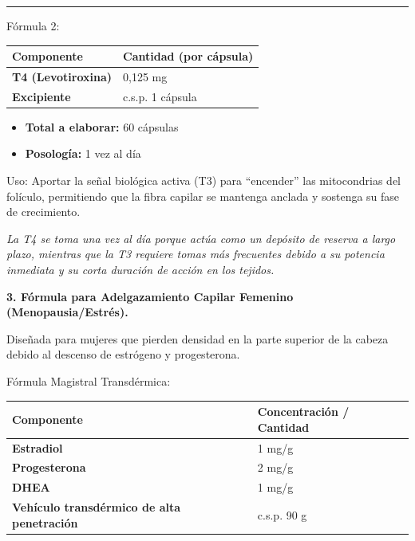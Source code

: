 \documentclass[
  spanish,
]{article}
\newcounter{none} %
\providecommand{\tightlist}{%
  \setlength{\itemsep}{0pt}\setlength{\parskip}{0pt}}
\begin{document}
\begin{center}\rule{0.5\linewidth}{0.5pt}\end{center}

Fórmula 2:

{\def\LTcaptype{none} %
\begin{longtable}[]{@{}ll@{}}
\toprule\noalign{}
Componente & Cantidad (por cápsula) \\
\midrule\noalign{}
\endhead
\bottomrule\noalign{}
\endlastfoot
\textbf{T4 (Levotiroxina)} & 0,125 mg \\
\textbf{Excipiente} & c.s.p. 1 cápsula \\
\end{longtable}
}

\begin{itemize}
\tightlist
\item
  \textbf{Total a elaborar:} 60 cápsulas
\item
  \textbf{Posología:} 1 vez al día
\end{itemize}

Uso: Aportar la señal biológica activa (T3) para ``encender'' las mitocondrias del folículo, permitiendo que la fibra capilar se mantenga anclada y sostenga su fase de crecimiento.

\emph{La T4 se toma una vez al día porque actúa como un depósito de reserva a largo plazo, mientras que la T3 requiere tomas más frecuentes debido a su potencia inmediata y su corta duración de acción en los tejidos.}

\textbf{3. Fórmula para Adelgazamiento Capilar Femenino (Menopausia/Estrés).}

Diseñada para mujeres que pierden densidad en la parte superior de la cabeza debido al descenso de estrógeno y progesterona.

Fórmula Magistral Transdérmica:

{\def\LTcaptype{none} %
\begin{longtable}[]{@{}ll@{}}
\toprule\noalign{}
Componente & Concentración / Cantidad \\
\midrule\noalign{}
\endhead
\bottomrule\noalign{}
\endlastfoot
\textbf{Estradiol} & 1 mg/g \\
\textbf{Progesterona} & 2 mg/g \\
\textbf{DHEA} & 1 mg/g \\
\textbf{Vehículo transdérmico de alta penetración} & c.s.p. 90 g \\
\end{longtable}
}
\end{document}
